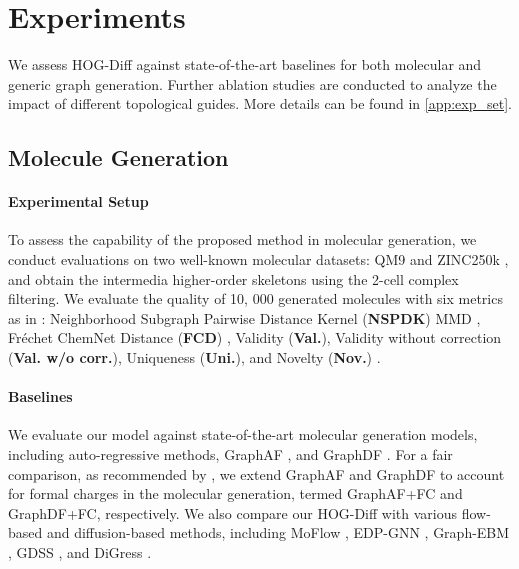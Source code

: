 \vspace{-1mm}
\section{Experiments}
\vspace{-1mm}
We assess HOG-Diff against state-of-the-art baselines for both molecular and generic graph generation.
Further ablation studies are conducted to analyze the impact of different topological guides.
More details can be found in \cref{app:exp_set}.

\vspace{-1mm}
\subsection{Molecule Generation}

\paragraph{Experimental Setup}
To assess the capability of the proposed method in molecular generation, we conduct evaluations on two well-known molecular datasets: QM9 \cite{data:qm9} and ZINC250k \cite{data:zinc250k}, and obtain the intermedia higher-order skeletons using the 2-cell complex filtering. 
%
We evaluate the quality of 10, 000 generated molecules with six metrics as in \citet{GDSS+ICML2022}: 
Neighborhood Subgraph Pairwise Distance Kernel (\textbf{NSPDK}) MMD \cite{NSPKD-MMD},
Fr{\'e}chet ChemNet Distance (\textbf{FCD}) \cite{FCD},
Validity (\textbf{Val.}), 
Validity without correction (\textbf{Val. w/o corr.}), 
Uniqueness (\textbf{Uni.}), and 
Novelty (\textbf{Nov.}) \cite{GDSS+ICML2022}.

\paragraph{Baselines}
We evaluate our model against state-of-the-art molecular generation models, including auto-regressive methods, GraphAF \cite{GraphAF-ICLR2020}, and GraphDF \cite{GraphDF-ICML2021}. 
For a fair comparison, as recommended by \citet{GDSS+ICML2022}, we extend GraphAF and GraphDF to account for formal charges in the molecular generation, termed GraphAF+FC and GraphDF+FC, respectively. 
We also compare our HOG-Diff with various flow-based and diffusion-based methods, including MoFlow \cite{Moflow-SIGKDD2020}, EDP-GNN \cite{EDPGNN-2020}, Graph-EBM \cite{GraphEBM2021}, GDSS \cite{GDSS+ICML2022}, and DiGress \cite{DiGress+ICLR2023}.




